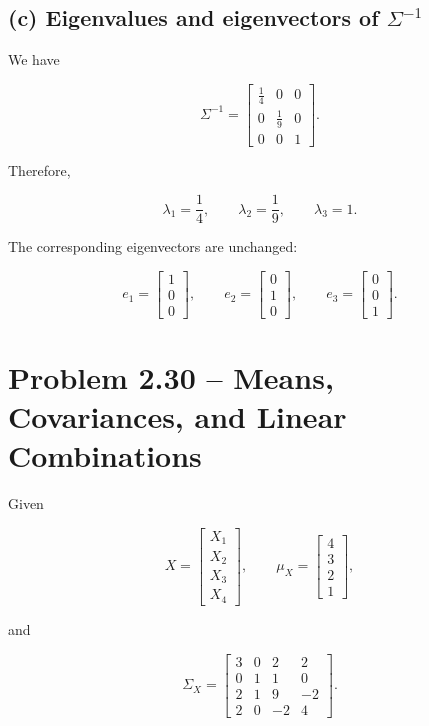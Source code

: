 \documentclass[12pt]{article}
\begin{document}
\subsection*{(c) Eigenvalues and eigenvectors of $\Sigma^{-1}$}

We have

\[
\Sigma^{-1}
=
\begin{bmatrix}
\frac14&0&0\\
0&\frac19&0\\
0&0&1
\end{bmatrix}.
\]

Therefore,

\[
\boxed{
\lambda_1=\frac14,\qquad
\lambda_2=\frac19,\qquad
\lambda_3=1.
}
\]

The corresponding eigenvectors are unchanged:

\[
\boxed{
e_1=
\begin{bmatrix}
1\\0\\0
\end{bmatrix},
\qquad
e_2=
\begin{bmatrix}
0\\1\\0
\end{bmatrix},
\qquad
e_3=
\begin{bmatrix}
0\\0\\1
\end{bmatrix}.
}
\]

\section*{Problem 2.30 -- Means, Covariances, and Linear Combinations}

Given

\[
X=
\begin{bmatrix}
X_1\\
X_2\\
X_3\\
X_4
\end{bmatrix},
\qquad
\mu_X=
\begin{bmatrix}
4\\
3\\
2\\
1
\end{bmatrix},
\]

and

\[
\Sigma_X=
\begin{bmatrix}
3&0&2&2\\
0&1&1&0\\
2&1&9&-2\\
2&0&-2&4
\end{bmatrix}.
\]
\end{document}
